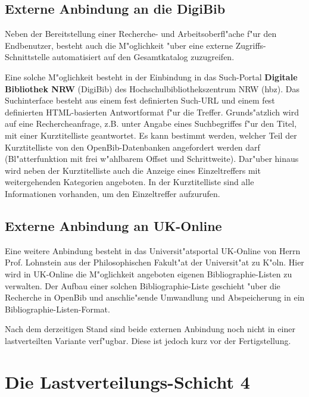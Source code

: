 \documentclass[11pt, twoside, a4paper, BCOR8mm, DIV12, bibtotoc,idxtotoc]{scrbook}
\begin{document}
\begin{itemize}
\begin{description}
\end{description}

\subsection{Externe Anbindung an die DigiBib}

Neben der Bereitstellung einer Recherche- und Arbeitsoberfl"ache f"ur
den Endbenutzer, besteht auch die M"oglichkeit "uber eine externe
Zugriffs-Schnittstelle automatisiert auf den Gesamtkatalog
zuzugreifen.

Eine solche M"oglichkeit besteht in der Einbindung in das Such-Portal
\textbf{Digitale Bibliothek NRW} (DigiBib) des
Hoch\-schul\-bibliotheks\-zentrum NRW (hbz). Das Suchinterface besteht aus
einem fest definierten Such-URL und einem fest definierten
HTML-basierten Antwortformat f"ur die Treffer. Grunds"atzlich wird auf
eine Rechercheanfrage, z.B. unter Angabe eines Suchbegriffes f"ur den
Titel, mit einer Kurztitelliste geantwortet. Es kann bestimmt werden,
welcher Teil der Kurztitelliste von den OpenBib-Daten\-banken
angefordert werden darf (Bl"atterfunktion mit frei w"ahlbarem Offset
und Schrittweite). Dar"uber hinaus wird neben der Kurztitelliste auch
die Anzeige eines Einzeltreffers mit weiter\-gehen\-den Kategorien
angeboten. In der Kurztitelliste sind alle Informationen vorhanden, um
den Einzeltreffer aufzurufen.

\subsection{Externe Anbindung an UK-Online}

Eine weitere Anbindung besteht in das Universit"atsportal UK-Online
von Herrn Prof. Lohnstein aus der Philosophischen Fakult"at der
Universit"at zu K"oln. Hier wird in UK-Online die M"oglichkeit
angeboten eigenen Bibliographie-Listen zu verwalten. Der Aufbau einer
solchen Bibliographie-Liste geschieht "uber die Recherche in OpenBib
und anschlie"sende Umwandlung und Ab\-spei\-cherung in ein
Bibliographie-Listen-Format.

Nach dem derzeitigen Stand sind beide externen Anbindung noch nicht in
einer lastverteilten Variante verf"ugbar. Diese ist jedoch kurz vor
der Fertigstellung.

\section{Die Lastverteilungs-Schicht 4}


\end{itemize}
\end{document}
